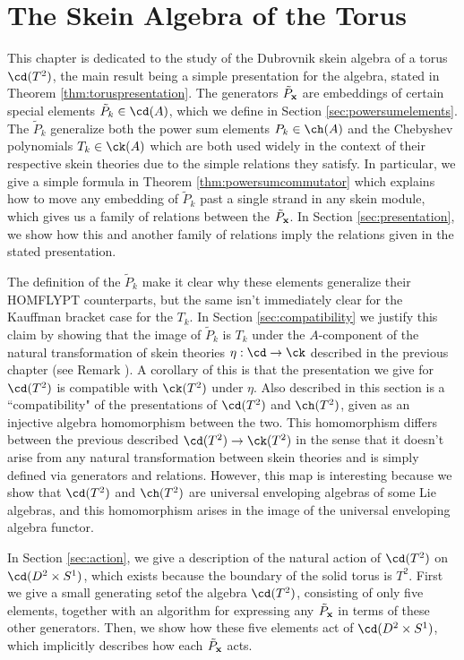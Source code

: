 \chapter{The Skein Algebra of the Torus} \label{chap:torus}

This chapter is dedicated to the study of the Dubrovnik skein algebra of a torus $\cd(T^2)$, the main result being a simple presentation for the algebra, stated in Theorem \ref{thm:toruspresentation}. The generators $\tilde{P}_{\mathbf{x}}$ are embeddings of certain special elements $\tilde{P}_k \in \cd(A)$, which we define in Section \ref{sec:powersumelements}. The $\tilde{P}_k$ generalize both the power sum elements $P_k \in \ch(A)$ and the Chebyshev polynomials $T_k \in \ck(A)$ which are both used widely in the context of their respective skein theories due to the simple relations they satisfy. In particular, we give a simple formula in Theorem \ref{thm:powersumcommutator} which explains how to move any embedding of $\tilde{P}_k$ past a single strand in any skein module, which gives us a family of relations between the $\tilde{P}_{\mathbf{x}}$. In Section \ref{sec:presentation}, we show how this and another family of relations imply the relations given in the stated presentation. 

The definition of the $\tilde{P}_k$ make it clear why these elements generalize their HOMFLYPT counterparts, but the same isn't immediately clear for the Kauffman bracket case for the $T_k$. In Section \ref{sec:compatibility} we justify this claim by showing that the image of $\tilde{P}_k$ is $T_k$ under the $A$-component of the natural transformation of skein theories $\eta:\cd \to \ck$ described in the previous chapter (see Remark \label{rmk:naturaltransformation}). A corollary of this is that the presentation we give for $\cd(T^2)$ is compatible with $\ck(T^2)$ under $\eta$. Also described in this section is a ``compatibility" of the presentations of $\cd(T^2)$ and $\ch(T^2)$, given as an injective algebra homomorphism between the two. This homomorphism differs between the previous described $\cd(T^2) \to \ck(T^2)$ in the sense that it doesn't arise from any natural transformation between skein theories and is simply defined via generators and relations. However, this map is interesting because we show that $\cd(T^2)$ and $\ch(T^2)$ are universal enveloping algebras of some Lie algebras, and this homomorphism arises in the image of the universal enveloping algebra functor. 

In Section \ref{sec:action}, we give a description of the natural action of $\cd(T^2)$  on $\cd(D^2 \times S^1)$, which exists because the boundary of the solid torus is $T^2$. First we give a small generating setof the algebra $\cd(T^2)$, consisting of only five elements, together with an algorithm for expressing any $\tilde{P}_{\mathbf{x}}$ in terms of these other generators. Then, we show how these five elements act of $\cd(D^2 \times S^1)$, which implicitly describes how each $\tilde{P}_{\mathbf{x}}$ acts. 

